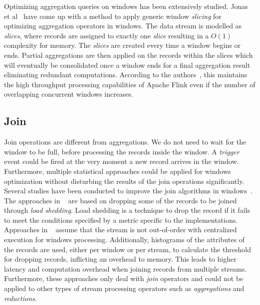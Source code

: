 Optimizing aggregation queries 
on windows has been extensively studied. Jonas et al~\cite{scotty, jonas_scotty} have come up with a method to 
apply generic window \emph{slicing} for optimizing aggregation operators in windows. 
The data stream is modelled as \emph{slices}, where 
records are assigned to exactly one \emph{slice} resulting in a 
$O(1)$ complexity for memory. The \emph{slices} are created every time a 
window begins or ends. Partial aggregations are then applied on the 
records within the slices which will eventually be consolidated once 
a window ends for a final aggregation result eliminating redundant 
computations. According to the authors~\cite{jonas_scotty}, this maintains 
the high throughput processing capabilities of Apache Flink even if the 
number of overlapping concurrent windows increases. 


\subsection{Join}%
\label{sub:Join}

Join operations are different from aggregations. We do not need 
to wait for the window to be full, before processing the records inside the 
window. A \emph{trigger} event could be fired at the very moment a new 
record arrives in the window. Furthermore, multiple statistical approaches 
could be applied for windows optimization without disturbing the results 
of the join operations significantly. Several studies have been conducted to 
improve the join algorithms in windows~\cite{vctw_join, join_tracking, grubjoin, approximate_window_sem, approx_window}. 
The approaches in ~\cite{grubjoin, approximate_window_sem, approx_window} are based 
on dropping some of the records to be joined through \emph{load shedding}. 
Load shedding is a technique to drop the record if 
it fails to meet the conditions specified 
by a metric specific to the implementations. Approaches in ~\cite{grubjoin, approximate_window_sem, approx_window}
assume that the stream is not out-of-order with centralized execution for 
windows processing. Additionally, histograms of the attributes of the records are used, 
either per window or per stream, 
to calculate the threshold for dropping records, inflicting an overhead to memory. 
This leads to higher latency and computation overhead 
when joining records from multiple streams. Furthermore, 
these approaches only deal with \emph{join} operators and could not be applied to other 
types of stream processing operators such as \emph{aggregations} and \emph{reductions}.

